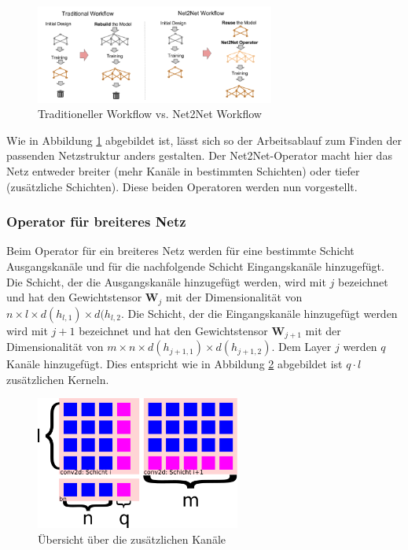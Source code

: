 \begin{figure}[h]
 \centering
 \includegraphics[width=0.7\textwidth]{KapitelPartA/images/net2net.png}
 \caption{Traditioneller Workflow vs. Net2Net Workflow}
 \label{abb:net2net}
\end{figure}


Wie in Abbildung \ref{abb:net2net} abgebildet ist, lässt sich so der Arbeitsablauf zum Finden der passenden Netzstruktur anders gestalten. Der Net2Net-Operator macht hier das Netz entweder breiter (mehr Kanäle in bestimmten Schichten) oder tiefer (zusätzliche Schichten). Diese beiden Operatoren werden nun vorgestellt.

\subsubsection{Operator für breiteres Netz}
Beim Operator für ein breiteres Netz werden für eine bestimmte Schicht Ausgangskanäle und für die nachfolgende Schicht Eingangskanäle hinzugefügt. Die Schicht, der die Ausgangskanäle hinzugefügt werden, wird mit $j$ bezeichnet und hat den Gewichtstensor $\mathbf{W}_j$ mit der Dimensionalität von $n \times l \times d(h_{l,1}) \times d(h_{l,2}$. Die Schicht, der die Eingangskanäle hinzugefügt werden wird mit $j+1$ bezeichnet und hat den Gewichtstensor $\mathbf{W}_{j+1}$ mit der Dimensionalität von $m \times n \times d(h_{j+1,1}) \times d(h_{j+1,2})$. Dem Layer $j$ werden $q$ Kanäle hinzugefügt. Dies entspricht wie in Abbildung \ref{abb:channels} abgebildet ist $q \cdot l $ zusätzlichen Kerneln. 
\begin{figure}[h]
 \centering
 \includegraphics[width=0.6\textwidth]{KapitelPartA/images/channels.png}
 \caption{Übersicht über die zusätzlichen Kanäle}
\label{abb:channels}
 \end{figure}



